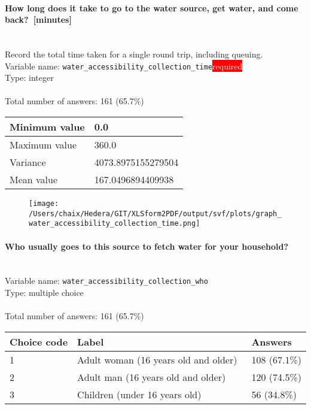 \documentclass[11.5pt, a4paper]{scrartcl}
\begin{document}
\paragraph{How long does it take to go to the water source, get water, and come back? [minutes]}
\ \\ {\small Record the total time taken for a single round trip, including queuing. }
\  \\Variable name: \texttt{water\_accessibility\_collection\_time}\hfill\colorbox{red}{\small{\textcolor{white}{required}}}\\
 Type: integer\\
\\Total number of answers: 161 (65.7\%)
\\[0.2em] \begin{tabular}{p{4cm}|p{8cm}}
Minimum value &0.0 \\
\hline
\cellcolor{mygray} Maximum value & \cellcolor{mygray}360.0 \\
\hline
Variance &4073.8975155279504 \\
\hline
\cellcolor{mygray} Mean value & \cellcolor{mygray}167.0496894409938 \\
\hline
\end{tabular}
\begin{figure}[H]
\centering
\texttt{[image: /Users/chaix/Hedera/GIT/XLSform2PDF/output/svf/plots/graph\_water\_accessibility\_collection\_time.png]}
\end{figure}
\paragraph{Who usually goes to this source to fetch water for your household? }
\  \\Variable name: \texttt{water\_accessibility\_collection\_who}\\
Type: multiple choice\\
\\Total number of answers: 161 (65.7\%)
\\[0.2em] \begin{tabular}{p{4cm}|p{8cm}|p{3cm}}
Choice code & Label & Answers \\
\hline
1 & Adult woman (16 years old and older) & \cellcolor{color3}108 (67.1\%)\\
\cellcolor{mygray} 2 & \cellcolor{mygray}Adult man (16 years old and older)  & \cellcolor{color3}120 (74.5\%)\\
3 & Children (under 16 years old) & \cellcolor{color1}56 (34.8\%)\\
\end{tabular}
\end{document}
